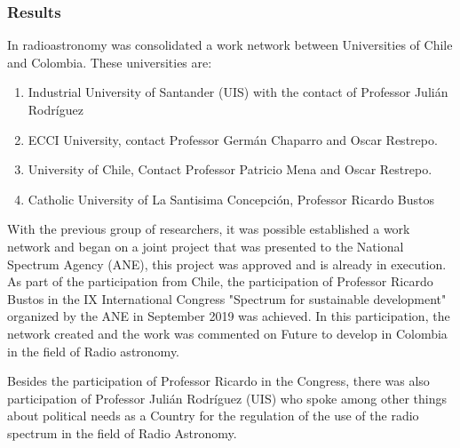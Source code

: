 \subsubsection{Results}
In radioastronomy was consolidated a work network between Universities of Chile and Colombia.
These universities are: 
\begin{enumerate}
    \item Industrial University of Santander (UIS) with the contact of
      Professor Julián Rodríguez 
    \item ECCI University, contact Professor Germán Chaparro and Oscar Restrepo.
    \item University of Chile, Contact Professor Patricio Mena and
      Oscar Restrepo. 
    \item Catholic University of La Santisima Concepción, Professor
      Ricardo Bustos 
\end{enumerate}

With the previous group of researchers, it was possible established a
work network and began on a joint project that was presented to the
National Spectrum Agency (ANE), this project was approved and is
already in execution. As part of the participation from Chile, the
participation of Professor Ricardo Bustos in the IX International
Congress "Spectrum for sustainable development" organized by the ANE
in September 2019 was achieved. In this participation, the network
created and the work was commented on Future to develop in Colombia in
the field of Radio astronomy. 

Besides the participation of Professor Ricardo in the Congress, there
was also participation of Professor Julián Rodríguez (UIS) who spoke
among other things about political needs as a Country for the
regulation of the use of the radio spectrum in the field of Radio
Astronomy. 








